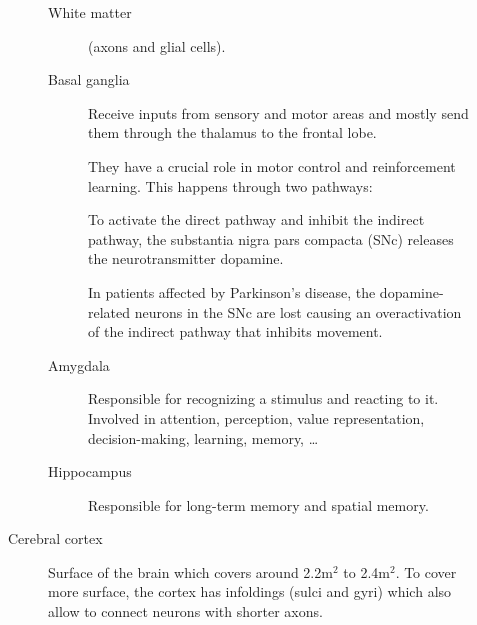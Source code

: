 \begin{description}
\begin{description}
\begin{description}
                \item[White matter] 
                    (axons and glial cells).

                \item[Basal ganglia] 
                    Receive inputs from sensory and motor areas and 
                    mostly send them through the thalamus to the frontal lobe.

                    They have a crucial role in motor control and reinforcement learning.
                    This happens through two pathways:
                    To activate the direct pathway and inhibit the indirect pathway, the substantia nigra pars compacta (SNc) releases the neurotransmitter dopamine.

                    \begin{example}
                        In patients affected by Parkinson's disease, the dopamine-related neurons in the SNc are lost causing
                        an overactivation of the indirect pathway that inhibits movement.
                    \end{example}

                \item[Amygdala] 
                    Responsible for recognizing a stimulus and reacting to it.
                    Involved in attention, perception, value representation, decision-making, learning, memory, \dots

                \item[Hippocampus] 
                    Responsible for long-term memory and spatial memory.
            \end{description}

        \item[Cerebral cortex] 
            Surface of the brain which covers around 2.2m$^2$ to 2.4m$^2$.
            To cover more surface, the cortex has infoldings (sulci and gyri) which also allow to connect neurons with shorter axons.


\end{description}
\end{description}
